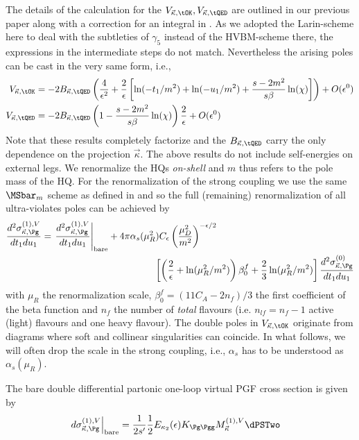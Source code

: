 The details of the calculation for the $V_{\vec \kappa,\tOK},V_{\vec \kappa,\tQED}$ are outlined in our previous paper \cite{Hekhorn:2018ywm} along with a correction for an integral in \cite{Laenen1993162}. As we adopted the Larin-scheme here to deal with the subtleties of $\gamma_5$ instead of the HVBM-scheme there, the expressions in the intermediate steps do not match. Nevertheless the arising poles can be cast in the very same form, i.e.,
\begin{align}
V_{\vec \kappa,\tOK} &= -2B_{\vec \kappa,\tQED}\left(\frac 4 {\epsilon^2} + \frac 2 \epsilon\left[\ln(-t_1/m^2) + \ln(-u_1/m^2) +\frac{s-2m^2}{s\beta}\ln(\chi)\right] \right) + O(\epsilon^0)\\
V_{\vec \kappa,\tQED} &= -2B_{\vec \kappa,\tQED}\left(1-\frac{s-2m^2}{s\beta}\ln(\chi)\right)\frac 2 \epsilon + O(\epsilon^0)
\end{align}
Note that these results completely factorize and the $B_{\vec \kappa,\tQED}$ carry the only dependence on the projection $\vec\kappa$. The above results do not include self-energies on external legs. We renormalize the HQs \textit{on-shell} and $m$ thus refers to the pole mass of the HQ. For the renormalization of the strong coupling we use the same $\MSbar_m$ scheme as defined in \cite{Hekhorn:2018ywm} and so the full (remaining) renormalization of all ultra-violates poles can be achieved by
\begin{align}
\frac{d^2\sigma_{\vec \kappa,\Pg}^{(1),V}}{dt_1du_1} &=\left.\frac{d^2\sigma_{\vec \kappa,\Pg}^{(1),V}}{dt_1du_1} \right|_{\text{bare}}+ 4\pi\alpha_s(\mu_R^2)C_\epsilon\left(\frac{\mu_D^2}{m^2}\right)^{-\epsilon/2}\nonumber\\
 &\hspace{120pt}\left[\left(\frac 2 \epsilon +\ln(\mu_R^2/m^2)\right)\beta_0^f +\frac 2 3 \ln(\mu_R^2/m^2)\right]\frac{d^2\sigma_{\vec \kappa,\Pg}^{(0)}}{dt_1du_1}
\end{align}
with $\mu_R$ the renormalization scale, $\beta_0^f = (11C_A- 2n_{f})/3$ the first coefficient of the beta function and $n_f$ the number of \textit{total} flavours (i.e. $n_{lf}=n_f-1$ active (light) flavours and one heavy flavour). The double poles in $V_{\vec \kappa,\tOK}$ originate from diagrams where soft and collinear singularities can coincide. In what follows, we will often drop the scale in the strong coupling, i.e., $\alpha_s$ has to be understood as $\alpha_s(\mu_R)$.

The bare double differential partonic one-loop virtual PGF cross section is given by
\begin{align}
\left.d\sigma_{\vec \kappa,\Pg}^{(1),V}\right|_{\text{bare}} &= \frac 1 {2s'}\frac 1 2 E_{\kappa_2}(\epsilon) K_{\Pg\Pgg} M_{\vec \kappa}^{(1),V} \dPSTwo
\end{align}
